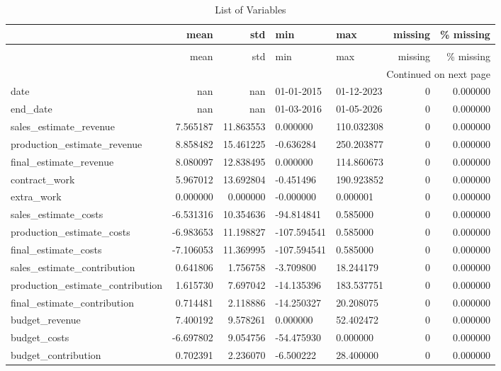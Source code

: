\begin{landscape}\begin{longtable}[h!]{lrrllrr}
\caption{List of Variables} \label{eda_1} \\
\toprule
 & mean & std & min & max & missing & \% missing \\
\midrule
\endfirsthead
\caption[]{List of Variables} \\
\toprule
 & mean & std & min & max & missing & \% missing \\
\midrule
\endhead
\midrule
\multicolumn{7}{r}{Continued on next page} \\
\midrule
\endfoot
\bottomrule
\endlastfoot
date & nan & nan & 01-01-2015 & 01-12-2023 & 0 & 0.000000 \\
end_date & nan & nan & 01-03-2016 & 01-05-2026 & 0 & 0.000000 \\
sales_estimate_revenue & 7.565187 & 11.863553 & 0.000000 & 110.032308 & 0 & 0.000000 \\
production_estimate_revenue & 8.858482 & 15.461225 & -0.636284 & 250.203877 & 0 & 0.000000 \\
final_estimate_revenue & 8.080097 & 12.838495 & 0.000000 & 114.860673 & 0 & 0.000000 \\
contract_work & 5.967012 & 13.692804 & -0.451496 & 190.923852 & 0 & 0.000000 \\
extra_work & 0.000000 & 0.000000 & -0.000000 & 0.000001 & 0 & 0.000000 \\
sales_estimate_costs & -6.531316 & 10.354636 & -94.814841 & 0.585000 & 0 & 0.000000 \\
production_estimate_costs & -6.983653 & 11.198827 & -107.594541 & 0.585000 & 0 & 0.000000 \\
final_estimate_costs & -7.106053 & 11.369995 & -107.594541 & 0.585000 & 0 & 0.000000 \\
sales_estimate_contribution & 0.641806 & 1.756758 & -3.709800 & 18.244179 & 0 & 0.000000 \\
production_estimate_contribution & 1.615730 & 7.697042 & -14.135396 & 183.537751 & 0 & 0.000000 \\
final_estimate_contribution & 0.714481 & 2.118886 & -14.250327 & 20.208075 & 0 & 0.000000 \\
budget_revenue & 7.400192 & 9.578261 & 0.000000 & 52.402472 & 0 & 0.000000 \\
budget_costs & -6.697802 & 9.054756 & -54.475930 & 0.000000 & 0 & 0.000000 \\
budget_contribution & 0.702391 & 2.236070 & -6.500222 & 28.400000 & 0 & 0.000000 \\

\end{longtable}
\end{landscape}
